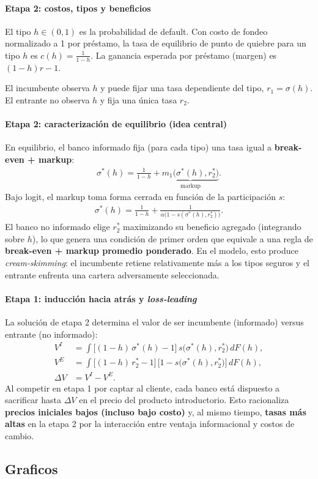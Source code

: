 \documentclass[11pt]{article}
\theoremstyle{plain}
\theoremstyle{plain}
\begin{document}
{    \paragraph{Etapa 2: costos, tipos y beneficios}
    El tipo $h\in(0,1)$ es la probabilidad de default. Con costo de fondeo normalizado a 1 por préstamo, la tasa de equilibrio de punto de quiebre para un tipo $h$ es $c(h)=\tfrac{1}{1-h}$. La ganancia esperada por préstamo (margen) es $(1-h)r-1$.

    El incumbente observa $h$ y puede fijar una tasa dependiente del tipo, $r_1=\sigma(h)$. El entrante no observa $h$ y fija una única tasa $r_2$.

    \paragraph{Etapa 2: caracterización de equilibrio (idea central)}
    En equilibrio, el banco informado fija (para cada tipo) una tasa igual a \textbf{break-even + markup}:
    \begin{align*}
        \sigma^*(h) = \frac{1}{1-h} + \underbrace{m_1\big(\sigma^*(h),r_2^*\big)}_{\text{markup}}.
    \end{align*}
    Bajo logit, el markup toma forma cerrada en función de la participación $s$:
    \begin{align*}
        \sigma^*(h) = \frac{1}{1-h} + \frac{1}{\alpha\big(1-s(\sigma^*(h),r_2^*)\big)}.
    \end{align*}
    El banco no informado elige $r_2^*$ maximizando su beneficio agregado (integrando sobre $h$), lo que genera una condición de primer orden que equivale a una regla de \textbf{break-even + markup promedio ponderado}. En el modelo, esto produce \textit{cream-skimming}: el incumbente retiene relativamente más a los tipos seguros y el entrante enfrenta una cartera adversamente seleccionada.

    \paragraph{Etapa 1: inducción hacia atrás y \textit{loss-leading}}
    La solución de etapa 2 determina el valor de ser incumbente (informado) versus entrante (no informado):
    \begin{align*}
        V^{I} &= \int \big[(1-h)\,\sigma^*(h)-1\big]\, s\big(\sigma^*(h),r_2^*\big)\, dF(h),\\
        V^{E} &= \int \big[(1-h)\,r_2^*-1\big]\, \big[1-s\big(\sigma^*(h),r_2^*\big)\big] \, dF(h),\\
        \Delta V &= V^{I}-V^{E}.
    \end{align*}
    Al competir en etapa 1 por captar al cliente, cada banco está dispuesto a sacrificar hasta $\Delta V$ en el precio del producto introductorio. Esto racionaliza \textbf{precios iniciales bajos (incluso bajo costo)} y, al mismo tiempo, \textbf{tasas más altas} en la etapa 2 por la interacción entre ventaja informacional y costos de cambio.

    }









\newpage
\printbibliography
 
\subsection{Graficos}
\end{document}
